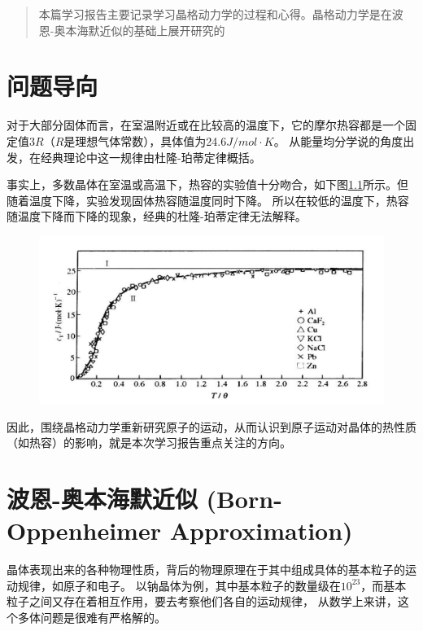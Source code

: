 \documentclass[declarePage]{ecnuthesis}
\begin{document}
\frontmatter

\begin{abstract}
本篇学习报告主要记录学习晶格动力学的过程和心得。晶格动力学是在波恩-奥本海默近似的基础上展开研究的
\end{abstract}



\mainmatter

\chapter{问题导向} 

对于大部分固体而言，在室温附近或在比较高的温度下，它的摩尔热容都是一个固定值$3R$（$R$是理想气体常数），具体值为24.6$J/mol \cdot K$。%
从能量均分学说的角度出发，在经典理论中这一规律由杜隆-珀蒂定律概括。\cite{xxx}

事实上，多数晶体在室温或高温下，热容的实验值十分吻合，如下图\ref{HC}所示。但随着温度下降，实验发现固体热容随温度同时下降。%
所以在较低的温度下，热容随温度下降而下降的现象，经典的杜隆-珀蒂定律无法解释。
\begin{figure}[htb]
    \centering
    \includegraphics[width=.7\textwidth]{HC.png}
    \label{HC}
\end{figure}

因此，围绕晶格动力学重新研究原子的运动，从而认识到原子运动对晶体的热性质（如热容）的影响，就是本次学习报告重点关注的方向。

\chapter{波恩-奥本海默近似 (Born-Oppenheimer Approximation)}

晶体表现出来的各种物理性质，背后的物理原理在于其中组成具体的基本粒子的运动规律，如原子和电子。%
以钠晶体为例，其中基本粒子的数量级在$10^{23}$，而基本粒子之间又存在着相互作用，要去考察他们各自的运动规律，%
从数学上来讲，这个多体问题是很难有严格解的。
\end{document}
